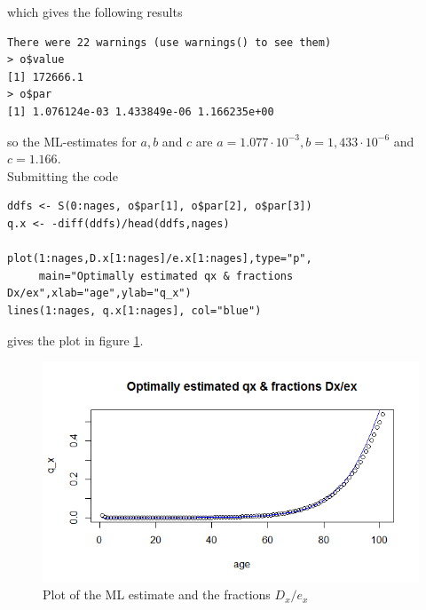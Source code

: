 which gives the following results

\begin{verbatim}
There were 22 warnings (use warnings() to see them)
> o$value
[1] 172666.1
> o$par
[1] 1.076124e-03 1.433849e-06 1.166235e+00
\end{verbatim}
so the ML-estimates for $a, b$ and $c$ are $a = 1.077 \cdot 10^{-3}, b=1,433 \cdot 10^{-6}$ and $c = 1.166$. \\
Submitting the code
\begin{verbatim}
ddfs <- S(0:nages, o$par[1], o$par[2], o$par[3])
q.x <- -diff(ddfs)/head(ddfs,nages)

plot(1:nages,D.x[1:nages]/e.x[1:nages],type="p",
     main="Optimally estimated qx & fractions Dx/ex",xlab="age",ylab="q_x")
lines(1:nages, q.x[1:nages], col="blue")
\end{verbatim}
gives the plot in figure \ref{Figure_Question9_1}.
\begin{center}
\begin{figure}[H]

\includegraphics[scale=1]{Question_9_MakehamGompertz_1.png}

\caption{Plot of the ML estimate and the fractions $D_x/e_x$}
\label{Figure_Question9_1}

\end{figure}
\end{center}

